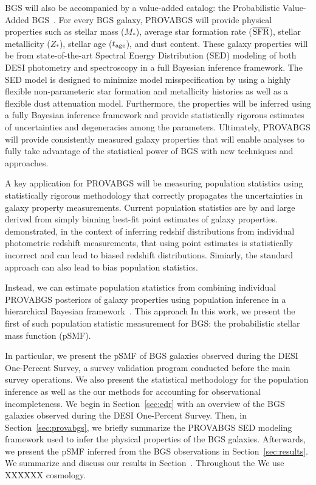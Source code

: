 BGS will also be accompanied by a value-added catalog: the Probabilistic
Value-Added BGS~\citep[PROVABGS;][]{hahn2022, kwon2022}.  
For every BGS galaxy, PROVABGS will provide physical properties such as stellar
mass ($M_*$), average star formation rate ($\overline{\rm SFR}$), stellar
metallicity ($Z_*$), stellar age ($t_{\rm age}$), and dust content. 
These galaxy properties will be from state-of-the-art Spectral Energy
Distribution (SED) modeling of both DESI photometry and spectroscopy in a full
Bayesian inference framework. 
The SED model is designed to minimize model misspecification by using a highly
flexible non-parameteric star formation and metallicity histories as well as a
flexible dust attenuation model.
Furthermore, the properties will be inferred using a fully Bayesian inference
framework and provide statistically rigorous estimates of uncertainties and
degeneracies among the parameters.  
Ultimately, PROVABGS will provide consistently measured galaxy properties that
will enable analyses to fully take advantage of the statistical power of BGS
with new techniques and approaches. 

A key application for PROVABGS will be measuring population statistics using 
statistically rigorous methodology that correctly propagates the uncertainties
in galaxy property measurements. 
Current population statistics are by and large derived from simply binning
best-fit point estimates of galaxy properties. 
\cite{malz2020} demonstrated, in the context of inferring redshif distributions
from individual photometric redshift measurements, that using point estimates
is statistically incorrect and can lead to biased redshift distributions. 
Simiarly, the standard approach can also lead to bias population statistics. 

Instead, we can estimate population statistics from combining individual
PROVABGS posteriors of galaxy properties using population inference in a
hierarchical Bayesian framework~\citep[\emph{e.g.}][]{hogg2010,
foreman-mackey2014, baronchelli2020}.
This approach 
In this work, we present the first of such population statistic measurement for
BGS: the probabilistic stellar mass function (pSMF). 

In particular, we present the pSMF of BGS galaxies observed during the DESI
One-Percent Survey, a survey validation program conducted before the main
survey operations. 
We also present the statistical methodology for the population inference as
well as the our methods for accounting for observational incompleteness. 
We begin in Section~\ref{sec:edr} with an overview of the BGS galaxies observed
during the DESI One-Percent Survey. 
Then, in Section~\ref{sec:provabgs}, we briefly summarize the PROVABGS SED
modeling framework used to infer the physical properties of the BGS galaxies.
Afterwards, we present the pSMF inferred from the BGS observations in
Section~\ref{sec:results}. 
We summarize and discuss our results in Section~\cite{sec:summary}.
Throughout the 
We use XXXXXX cosmology.
